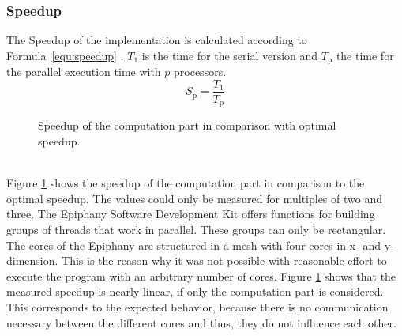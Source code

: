 \documentclass[american, hauptseminar, twoside]{zihpub}
\begin{document}
						\subsubsection*{Speedup}
						The Speedup of the implementation is calculated according to Formula~\ref{equ:speedup} \cite{Hennesy2012}. $T_\mathrm{1}$ is the time for the serial version and $T_\mathrm{p}$ the time for the parallel execution time with $p$ processors.
						\begin{equation}
							S_\mathrm{p}=\frac{T_\mathrm{1}}{T_\mathrm{p}}
							\label{equ:speedup}
						\end{equation}
						\begin{figure}
							\centering
							\caption{Speedup of the computation part in comparison with optimal speedup.}
							\label{fig:speedupcalc}
						\end{figure}
						\\
						Figure \ref{fig:speedupcalc} shows the speedup of the computation part in comparison to the optimal speedup. The values could only be measured for multiples of two and three. The Epiphany Software Development Kit offers functions for building groups of threads that work in parallel. These groups can only be rectangular. The cores of the Epiphany are structured in a mesh with four cores in x- and y-dimension. This is the reason why it was not possible with reasonable effort to execute the program with an arbitrary number of cores. Figure \ref{fig:speedupcalc} shows that the measured speedup is nearly linear, if only the computation part is considered. This corresponds to the expected behavior, because there is no communication necessary between the different cores and thus, they do not influence each other.						
\end{document}

